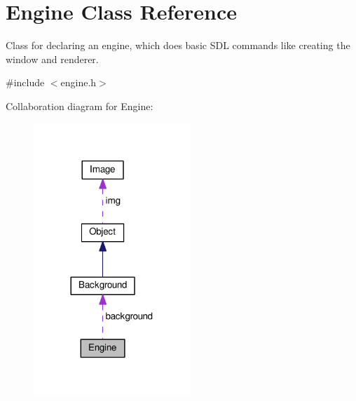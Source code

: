 \hypertarget{classEngine}{}\section{Engine Class Reference}
\label{classEngine}


Class for declaring an engine, which does basic S\+DL commands like creating the window and renderer.  




{\ttfamily \#include $<$engine.\+h$>$}



Collaboration diagram for Engine\+:\nopagebreak
\begin{figure}[H]
\begin{center}
\leavevmode
\includegraphics[width=168pt]{classEngine__coll__graph}
\end{center}
\end{figure}
